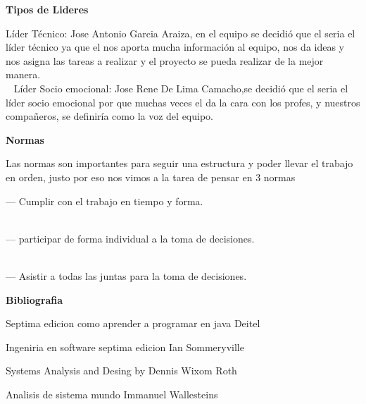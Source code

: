 \documentclass[10pt,a4paper]{report}
\begin{document}
\begin{titlepage}
\begin{flushleft}


{\Large\bfseries \center   Tipos de Lideres  \par}
 \vspace{.5cm}
  \justify
Líder Técnico: Jose Antonio Garcia Araiza, en el equipo se decidió que el seria el líder técnico ya que el nos aporta mucha información al equipo, nos da ideas y nos asigna las tareas a realizar y el proyecto se pueda realizar de la mejor manera.\\\
 \justify
Líder Socio emocional: Jose Rene De Lima Camacho,se decidió que el seria el líder socio emocional por que muchas veces el da la cara con los profes, y nuestros compañeros, se definiría como la voz del equipo.\\

 
 {\Large\bfseries \center  Normas  \par}
 \vspace{.5cm}
 \justify
Las normas son importantes para seguir una estructura y poder llevar el trabajo en orden, justo por eso nos vimos a la tarea de pensar en 3
normas \par
\vspace{.5cm}
--- Cumplir  con el trabajo en tiempo y forma.\\\

--- participar de forma individual a la toma de decisiones.\\\

--- Asistir a todas las juntas para la toma de decisiones.

\end{flushleft}
\end{titlepage}


\begin{titlepage}
 
{\Large\bfseries \center Bibliografia \par}
\vspace{1cm}
Septima edicion como aprender a programar en java Deitel\par 
Ingeniria en software septima edicion Ian Sommeryville\par
Systems Analysis and Desing by Dennis Wixom Roth\par 
Analisis de sistema mundo Immanuel Wallesteins
\end{titlepage}

\end{document}
